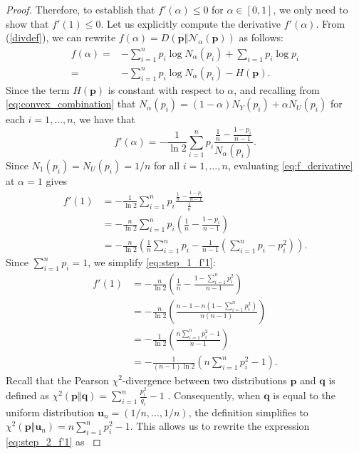 \documentclass[pdflatex,sn-basic,iicol]{sn-jnl}%
\theoremstyle{thmstyleone}%
\theoremstyle{thmstyletwo}%
\theoremstyle{thmstylethree}%
\newcommand{\N}{\mathcal{N}}
\newcommand{\bp}{\mathbf{p}}
\newcommand{\bq}{\mathbf{q}}
\newcommand{\bu}{\mathbf{u}}
\begin{document}
\begin{proof}
{        Therefore, to establish that $f'(\alpha)\leq 0$ for $\alpha\in[0,1]$, we only need to show that $f'(1)\leq 0$. Let us explicitly compute the derivative $f'(\alpha)$. From (\ref{divdef}), we can rewrite $f(\alpha)=D(\bp\Vert \N_\alpha(\bp))$ as follows:
        \begin{align}
       f(\alpha) =& -\sum_{i=1}^n p_i \log N_\alpha(p_i) +
        \sum_{i=1}p_i\log p_i\nonumber\\=& -\sum_{i=1}^n p_i \log N_\alpha(p_i) -H(\bp).\nonumber
    \end{align}
    Since the term $H(\bp)$ is constant with respect to $\alpha$, and recalling from \eqref{eq:convex_combination} that $N_\alpha(p_i)=(1-\alpha)N_Y(p_i)+\alpha N_U(p_i)$ for each $i=1,\dots,n$, we have that 
    \begin{equation}\label{eq:f_derivative}
        f'(\alpha)=-\frac{1}{\ln 2}\sum_{i=1}^n p_i\frac{\frac{1}{n}-\frac{1-p_i}{n-1}}{N_\alpha(p_i)}.
    \end{equation}
    Since $N_1(p_i)=N_U(p_i)=1/n$ for all $i=1,\dots,n$, evaluating \eqref{eq:f_derivative} at $\alpha=1$ gives
    \begin{align}
        f'(1)&=-\frac{1}{\ln 2}\sum_{i=1}^n p_i\frac{\frac{1}{n}-\frac{1-p_i}{n-1}}{\frac{1}{n}}\nonumber\\
        &=-\frac{n}{\ln 2}\sum_{i=1}^n p_i\left(\frac{1}{n}-\frac{1-p_i}{n-1}\right)\nonumber\\
        &=-\frac{n}{\ln 2}\left(\frac{1}{n}\sum_{i=1}^n p_i - \frac{1}{n-1}\left(\sum_{i=1}^n p_i -p_i^2\right)\right).\label{eq:step_1_f'1}
    \end{align}
    Since $\sum_{i=1}^n p_i=1$, we simplify \eqref{eq:step_1_f'1}:
    \begin{align}
         f'(1)&=-\frac{n}{\ln 2}\left(\frac{1}{n} - \frac{1-\sum_{i=1}^n p_i^2}{n-1}\right)\nonumber\\
         &=-\frac{n}{\ln 2}\left(\frac{n-1-n(1-\sum_{i=1}^n p_i^2)}{n(n-1)}\right)\nonumber\\
         &=-\frac{1}{\ln 2}\left(\frac{n\sum_{i=1}^n p_i^2-1}{n-1}\right)\nonumber\\
         &=-\frac{1}{(n-1)\ln 2}\left(n\sum_{i=1}^n p_i^2-1\right).\label{eq:step_2_f'1}
    \end{align}
    Recall that the Pearson $\chi^2$-divergence between two distributions $\bp$ and $\bq$ is defined as $\chi^2(\bp\Vert\bq)=\sum_{i=1}^n \frac{p_i^2}{q_i}-1$ \citep{sason2016f}. Consequently, when $\bq$ is equal to the uniform distribution $\bu_n=(1/n,\dots,1/n)$, the definition simplifies to $\chi^2(\bp\Vert\bu_n)=n\sum_{i=1}^n p_i^2-1$. This allows us to rewrite the expression \eqref{eq:step_2_f'1} as 
}
\end{proof}
\end{document}
